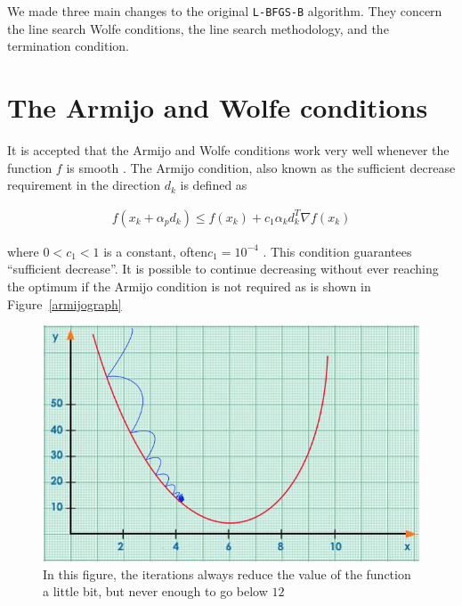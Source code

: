 We made three main changes to the original \texttt{L-BFGS-B} algorithm. They concern the line search Wolfe conditions, the line search methodology, and the termination condition.

\section{The Armijo and Wolfe conditions} \label{Wolfeconditions}

It is accepted that the Armijo and Wolfe conditions work very well whenever the function $f$ is smooth \citep{MR1855221}. The Armijo condition, also known as the sufficient decrease requirement in the direction $d_k$ is defined as

\begin{equation} \label{armijocondition}
  \begin{aligned}
    f(x_k + \alpha_p d_k) \leq f(x_k) + c_1 \alpha_k d_k^T \nabla f(x_k)
  \end{aligned}
\end{equation}

where $0 < c_1 < 1$ is a constant, often$c_1 = 10^{-4}$ \citep{nocedal}. This condition guarantees ``sufficient decrease''. It is possible to continue decreasing without ever reaching the optimum if the Armijo condition is not required as is shown in Figure~\eqref{armijograph}

\begin{figure} 
\begin{center}
\includegraphics[scale=0.5]{Figures/armijo.png}
\caption[Representation of the Armijo Condition in a Nutshell]{In this figure, the iterations always reduce the value of the function a little bit, but never enough to go below $12$}
\label{armijograph}
\end{center}
\end{figure}

